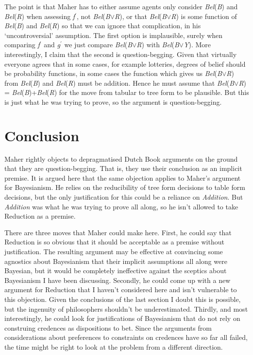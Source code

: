 The point is that Maher has to either assume agents only consider \textit{Bel}(\textit{B}) and \textit{Bel}(\textit{R}) when assessing \textit{f}\(^\prime\), not \textit{Bel}(\textit{B}${\vee}$\textit{R}), or that \textit{Bel}(\textit{B}${\vee}$\textit{R}) is some function of \textit{Bel}(\textit{B}) and \textit{Bel}(\textit{R}) so that we can ignore that complication, in his `uncontroversial' assumption. The first option is implausible, surely when comparing \textit{f}\(^\prime\) and \textit{g}\(^\prime\) we just compare \textit{Bel}(\textit{B}${\vee}$\textit{R}) with \textit{Bel}(\textit{B}${\vee}$\textit{Y}). More interestingly, I claim that the second is question-begging. Given that virtually everyone agrees that in some cases, for example lotteries, degrees of belief should be probability functions, in some cases the function which gives us \textit{Bel}(\textit{B}${\vee}$\textit{R}) from \textit{Bel}(\textit{B}) and \textit{Bel}(\textit{R}) must be addition. Hence he must assume that \textit{Bel}(\textit{B}${\vee}$\textit{R}) = \textit{Bel}(\textit{B})+\textit{Bel}(\textit{R}) for the move from tabular to tree form to be plausible. But this is just what he was trying to prove, so the argument is question-begging.



\section{Conclusion}
Maher rightly objects to depragmatised Dutch Book arguments on the ground that they are question-begging. That is, they use their conclusion as an implicit premise. It is argued here that the same objection applies to Maher's argument for Bayesianism. He relies on the reducibility of tree form decisions to table form decisions, but the only justification for this could be a reliance on \textit{Addition}. But \textit{Addition }was what he was trying to prove all along, so he isn't allowed to take Reduction as a premise.


There are three moves that Maher could make here. First, he could say that Reduction is so obvious that it should be acceptable as a premise without justification. The resulting argument may be effective at convincing some agnostics about Bayesianism that their implicit assumptions all along were Bayesian, but it would be completely ineffective against the sceptics about Bayesianism I have been discussing. Secondly, he could come up with a new argument for Reduction that I haven't considered here and isn't vulnerable to this objection. Given the conclusions of the last section I doubt this is possible, but the ingenuity of philosophers shouldn't be underestimated. Thirdly, and most interestingly, he could look for justifications of Bayesianism that do not rely on construing credences as dispositions to bet. Since the arguments from considerations about preferences to constraints on credences have so far all failed, the time might be right to look at the problem from a different direction.

